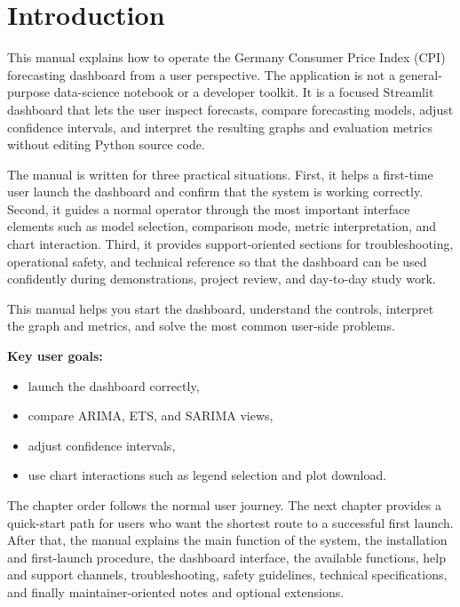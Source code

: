 %
%

\chapter{Introduction}
\label{ch:manual-introduction}

This manual explains how to operate the Germany Consumer Price Index (CPI) forecasting dashboard from a user perspective. The application is not a general-purpose data-science notebook or a developer toolkit. It is a focused Streamlit dashboard that lets the user inspect forecasts, compare forecasting models, adjust confidence intervals, and interpret the resulting graphs and evaluation metrics without editing Python source code.

The manual is written for three practical situations. First, it helps a first-time user launch the dashboard and confirm that the system is working correctly. Second, it guides a normal operator through the most important interface elements such as model selection, comparison mode, metric interpretation, and chart interaction. Third, it provides support-oriented sections for troubleshooting, operational safety, and technical reference so that the dashboard can be used confidently during demonstrations, project review, and day-to-day study work.

\begin{tcolorbox}[colback=blue!5!white, colframe=blue!75!black, title=Welcome to the CPI Forecasting Dashboard Manual]
This manual helps you start the dashboard, understand the controls, interpret the graph and metrics, and solve the most common user-side problems.

\textbf{Key user goals:}
\begin{itemize}
    \item launch the dashboard correctly,
    \item compare ARIMA, ETS, and SARIMA views,
    \item adjust confidence intervals,
    \item use chart interactions such as legend selection and plot download.
\end{itemize}
\end{tcolorbox}

The chapter order follows the normal user journey. The next chapter provides a quick-start path for users who want the shortest route to a successful first launch. After that, the manual explains the main function of the system, the installation and first-launch procedure, the dashboard interface, the available functions, help and support channels, troubleshooting, safety guidelines, technical specifications, and finally maintainer-oriented notes and optional extensions.

